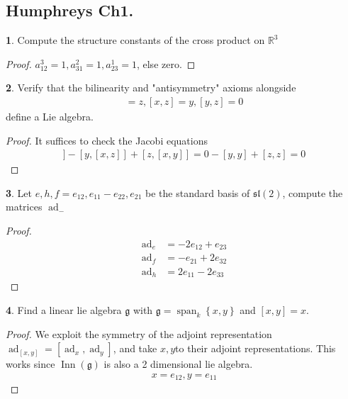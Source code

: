 \documentclass[10.5pt]{article}
\theoremstyle{definition}
\newtheorem{pb}{}
\numberwithin{example}{subsection}
\numberwithin{proposition}{subsection}
\numberwithin{pb}{subsection}
\newcommand{\set}[1]{\left\{#1\right\}}
\begin{document}
        \subsection{Humphreys Ch1.}
        \begin{pb}
            Compute the structure constants of the cross product on \(\mathbb{R}^3\)
            \begin{proof}
                \(a_{12}^3 = 1, a_{31}^2 = 1, a_{23}^1 = 1\), else zero.
            \end{proof}
        \end{pb}
        \begin{pb}
            Verify that the bilinearity and "antisymmetry" axioms alongside
            \begin{align}
                [x,y] = z, [x,z] = y, [y,z] = 0
            \end{align}
            define a Lie algebra.
            \begin{proof}
                It suffices to check the Jacobi equations
                \begin{align}
                    [x,[y,z]] - [y,[x,z]] + [z,[x,y]] = 0 - [y,y] + [z,z] = 0
                \end{align}
            \end{proof}
        \end{pb}
        \begin{pb}
            Let \(e,h,f = e_{12}, e_{11} - e_{22}, e_{21}\) be the standard basis of \(\mathfrak{sl}(2)\), compute the matrices \(\operatorname{ad}_{-}\)
            \begin{proof}
                \begin{align}
                    \operatorname{ad}_e &= -2e_{12} + e_{23} \\
                    \operatorname{ad}_f &= -e_{21} + 2e_{32} \\
                    \operatorname{ad}_h &= 2e_{11} - 2e_{33}
                \end{align}
            \end{proof}
        \end{pb}
        \begin{pb}
            Find a linear lie algebra \(\mathfrak{g}\) with \(\mathfrak{g} = \operatorname{span}_k\set{x,y}\) and \([x,y] = x\).
            \begin{proof}
                We exploit the symmetry of the adjoint representation \(\operatorname{ad}_{[x,y]} = [\operatorname{ad}_x,\operatorname{ad}_y]\), and take \(x,y\)to their adjoint representations. This works since \(\operatorname{Inn}(\mathfrak{g})\) is also a 2 dimensional lie algebra.
                \begin{align}
                    x = e_{12}, y = e_{11}
                \end{align}
            \end{proof}
        \end{pb}
\end{document}
